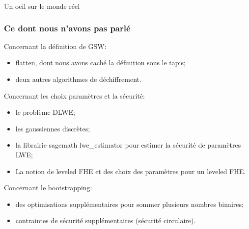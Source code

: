 \documentclass[10pt,xcolor={usenames,dvipsnames}]{beamer}
\begin{document}
\begin{section}{Un oeil sur le monde réel}

\begin{frame}
\frametitle{Ce dont nous n'avons pas parlé}
Concernant la définition de GSW:
\begin{itemize}
\item flatten, dont nous avons caché la définition sous le tapis;
\item deux autres algorithmes de déchiffrement.
\end{itemize}
Concernant les choix paramètres et la sécurité:

\begin{itemize}
\item le problème DLWE;
\item les gaussiennes discrètes;
\item la librairie sagemath lwe\_estimator pour estimer la sécurité de paramètres LWE;
\item La notion de leveled FHE et des choix des paramètres pour un leveled FHE.
\end{itemize}

Concernant le bootstrapping:
\begin{itemize}
\item des optimisations supplémentaires pour sommer plusieurs nombres binaires;
\item contraintes de sécurité supplémentaires (sécurité circulaire).
\end{itemize}
\end{frame}

\end{section}


\end{document}
